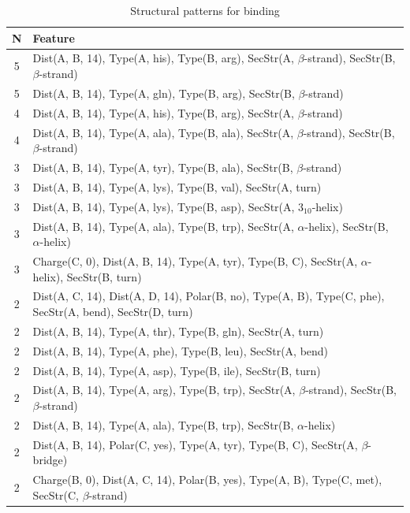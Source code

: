 \documentclass[11pt,twoside,a4paper]{book}
\begin{document}
\begin{table}\begin{tabularx}{\textwidth}{cX}\textbf{N} & \textbf{Feature} \\ \hline  
5 & Dist(A, B, 14),  Type(A, his), Type(B, arg), SecStr(A, $\beta$-strand), SecStr(B, $\beta$-strand)\\ \hline 
5 & Dist(A, B, 14),  Type(A, gln), Type(B, arg), SecStr(B, $\beta$-strand)\\ \hline 
4 & Dist(A, B, 14),  Type(A, his), Type(B, arg), SecStr(A, $\beta$-strand)\\ \hline 
4 & Dist(A, B, 14),  Type(A, ala), Type(B, ala), SecStr(A, $\beta$-strand), SecStr(B, $\beta$-strand)\\ \hline 
3 & Dist(A, B, 14),  Type(A, tyr), Type(B, ala), SecStr(B, $\beta$-strand)\\ \hline 
3 & Dist(A, B, 14),  Type(A, lys), Type(B, val), SecStr(A, turn)\\ \hline 
3 & Dist(A, B, 14),  Type(A, lys), Type(B, asp), SecStr(A, $3_{10}$-helix)\\ \hline 
3 & Dist(A, B, 14),  Type(A, ala), Type(B, trp), SecStr(A, $\alpha$-helix), SecStr(B, $\alpha$-helix)\\ \hline 
3 & Charge(C, 0), Dist(A, B, 14),  Type(A, tyr), Type(B, C), SecStr(A, $\alpha$-helix), \newline SecStr(B, turn)\\ \hline 
2 & Dist(A, C, 14), Dist(A, D, 14), Polar(B, no),  Type(A, B), Type(C, phe), \newline SecStr(A, bend), SecStr(D, turn)\\ \hline 
2 & Dist(A, B, 14),  Type(A, thr), Type(B, gln), SecStr(A, turn)\\ \hline 
2 & Dist(A, B, 14),  Type(A, phe), Type(B, leu), SecStr(A, bend)\\ \hline 
2 & Dist(A, B, 14),  Type(A, asp), Type(B, ile), SecStr(B, turn)\\ \hline 
2 & Dist(A, B, 14),  Type(A, arg), Type(B, trp), SecStr(A, $\beta$-strand), SecStr(B, $\beta$-strand)\\ \hline 
2 & Dist(A, B, 14),  Type(A, ala), Type(B, trp), SecStr(B, $\alpha$-helix)\\ \hline 
2 & Dist(A, B, 14), Polar(C, yes),  Type(A, tyr), Type(B, C), SecStr(A, $\beta$-bridge)\\ \hline 
2 & Charge(B, 0), Dist(A, C, 14), Polar(B, yes),  Type(A, B), Type(C, met), \newline SecStr(C, $\beta$-strand)\\ \hline 
 \end{tabularx}\caption{Structural patterns for binding}\label{tab:binding}\end{table}
\end{document}
